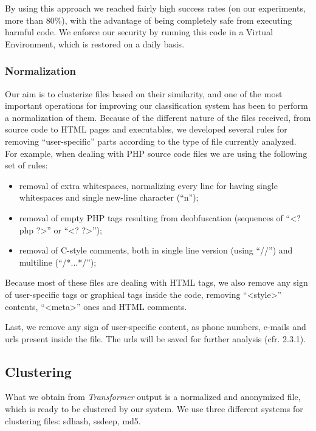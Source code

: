 By using this approach we reached fairly high success rates (on our experiments, more than 80\%), with the advantage of being completely safe from executing harmful code. We enforce our security by running this code in a Virtual Environment, which is restored on a daily basis.

\subsubsection{Normalization}
Our aim is to clusterize files based on their similarity, and one of the most important operations for improving our classification system has been to perform a normalization of them.
Because of the different nature of the files received, from source code to HTML pages and executables, we developed several rules for removing ``user-specific'' parts according to the type of file currently analyzed.
For example, when dealing with PHP source code files we are using the following set of rules:
\begin{itemize}
\item removal of extra whitespaces, normalizing every line for having single whitespaces and single new-line character (``\bs n'');
\item removal of empty PHP tags resulting from deobfuscation (sequences of ``<?php ?>'' or ``<? ?>''); %
\item removal of C-style comments, both in single line version (using ``//'') and multiline (``/*...*/'');
\end{itemize}

Because most of these files are dealing with HTML tags, we also remove any sign of user-specific tags or graphical tags inside the code, removing ``<style>'' contents, ``<meta>'' ones and HTML comments.

Last, we remove any sign of user-specific content, as phone numbers, e-mails and urls present inside the file. The urls will be saved for further analysis (cfr. 2.3.1).

\subsection{Clustering}
What we obtain from \emph{Transformer} output is a normalized and anonymized file, which is ready to be clustered by our system. We use three different systems for clustering files: sdhash, ssdeep, md5.

